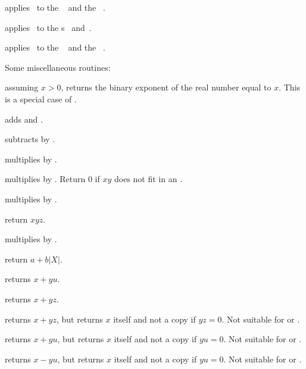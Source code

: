  applies \op\ to the
~ and the ~.

 applies \op\ to the
s~ and~.

 applies \op\ to the
~ and the ~.

\noindent Some miscellaneous routines:

 assuming $x > 0$, returns the binary exponent of
the real number equal to $x$. This is a special case of .



 adds  and .



 subtracts  by .

 multiplies  by .

 multiplies  by .
Return $0$ if $xy$ does not fit in an .

 multiplies  by .

 return $xyz$.

 multiplies  by .

 return $a + b|X|$.

 returns $x +yu$.

 returns $x + yz$.

 returns $x + yz$, but
returns $x$ itself and not a copy if $yz = 0$. Not suitable for
 or .

 returns $x +yu$, but
returns $x$ itself and not a copy if $yu = 0$. Not suitable for
 or .

 returns $x- yu$, but
returns $x$ itself and not a copy if $yu = 0$. Not suitable for
 or .

